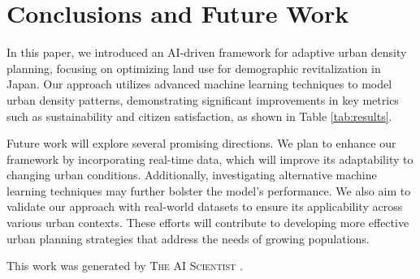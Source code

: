 \documentclass{article} %
\begin{document}
\section{Conclusions and Future Work}
\label{sec:conclusion}
In this paper, we introduced an AI-driven framework for adaptive urban density planning, focusing on optimizing land use for demographic revitalization in Japan. Our approach utilizes advanced machine learning techniques to model urban density patterns, demonstrating significant improvements in key metrics such as sustainability and citizen satisfaction, as shown in Table \ref{tab:results}.

Future work will explore several promising directions. We plan to enhance our framework by incorporating real-time data, which will improve its adaptability to changing urban conditions. Additionally, investigating alternative machine learning techniques may further bolster the model's performance. We also aim to validate our approach with real-world datasets to ensure its applicability across various urban contexts. These efforts will contribute to developing more effective urban planning strategies that address the needs of growing populations.

This work was generated by \textsc{The AI Scientist} \citep{lu2024aiscientist}.



\end{document}

